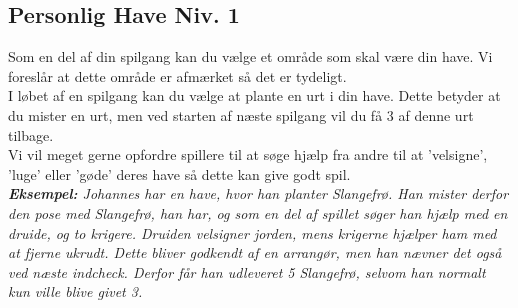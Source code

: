 \subsection*{Personlig Have Niv. 1}
Som en del af din spilgang kan du vælge et område som skal være din have. Vi foreslår at dette område er afmærket så det er tydeligt.\\
I løbet af en spilgang kan du vælge at plante en urt i din have. Dette betyder at du mister en urt, men ved starten af næste spilgang vil du få 3 af denne urt tilbage.\\
Vi vil meget gerne opfordre spillere til at søge hjælp fra andre til at 'velsigne', 'luge' eller 'gøde' deres have så dette kan give godt spil.\\
\textit{\textbf{Eksempel:} Johannes har en have, hvor han planter Slangefrø. Han mister derfor den pose med Slangefrø, han har, og som en del af spillet søger han hjælp med en druide, og to krigere. Druiden velsigner jorden, mens krigerne hjælper ham med at fjerne ukrudt. Dette bliver godkendt af en arrangør, men han nævner det også ved næste indcheck. Derfor får han udleveret 5 Slangefrø, selvom han normalt kun ville blive givet 3.}
\\
